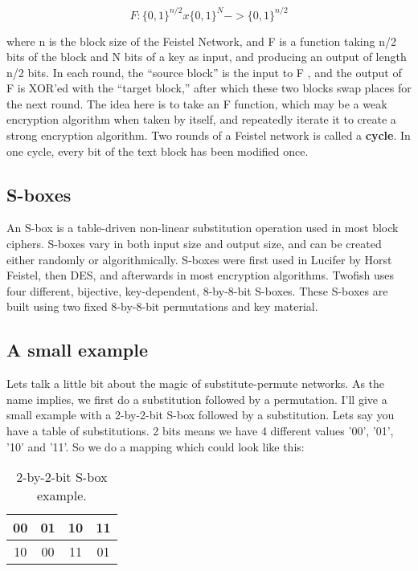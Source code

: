 \begin{equation*}
  F : \lbrace 0, 1\rbrace^{n/2} x \lbrace0, 1\rbrace^N -> \lbrace 0, 1\rbrace^{n/2}
\end{equation*}

where n is the block size of the Feistel Network, and F is a function taking n/2 bits of the block and N bits of a key as input, and producing an output of length n/2 bits. In each round, the “source block” is the input to F , and the output of F is XOR'ed with the “target block,” after which these two blocks swap places for the next round. The idea here is to take an F function, which may be a weak encryption algorithm when taken by itself, and repeatedly iterate it to create a strong encryption algorithm.  Two rounds of a Feistel network is called a \textbf{cycle}. In one cycle, every bit of the text block has been modified once.

\subsection{S-boxes}
An S-box is a table-driven non-linear substitution operation used in most block ciphers. S-boxes vary in both input size and output size, and can be created either randomly or algorithmically. S-boxes were first used in Lucifer by Horst Feistel, then DES, and afterwards in most encryption algorithms. Twofish uses four different, bijective, key-dependent, 8-by-8-bit S-boxes. These S-boxes are built using two fixed 8-by-8-bit permutations and key material.

\subsection{A small example}
Lets talk a little bit about the magic of substitute-permute networks. As the name implies, we first do a substitution followed by a permutation. I'll give a small example with a 2-by-2-bit S-box followed by a substitution.
Lets say you have a table of substitutions. 2 bits means we have 4 different values '00', '01', '10' and '11'.
So we do a mapping which could look like this:
\begin{table}[htp]
  \begin{center}
    \label{fig:small_subs_example}
    \begin{tabular}{|c|c|c|c|}
      \hline
      00 & 01 & 10 & 11 \\ \hline
      10 & 00 & 11 & 01 \\ \hline
    \end{tabular}
    \caption{2-by-2-bit S-box example.}
  \end{center}
\end{table}

